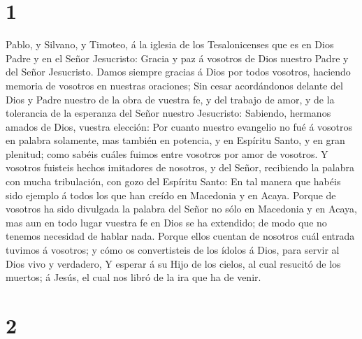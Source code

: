 \hypertarget{section}{%
\section{1}\label{section}}

 Pablo, y Silvano, y Timoteo, á la iglesia de los
Tesalonicenses que es en Dios Padre y en el Señor Jesucristo: Gracia y
paz á vosotros de Dios nuestro Padre y del Señor Jesucristo.
 Damos siempre gracias á Dios por todos vosotros, haciendo
memoria de vosotros en nuestras oraciones;  Sin cesar
acordándonos delante del Dios y Padre nuestro de la obra de vuestra fe,
y del trabajo de amor, y de la tolerancia de la esperanza del Señor
nuestro Jesucristo:  Sabiendo, hermanos amados de Dios,
vuestra elección:  Por cuanto nuestro evangelio no fué á
vosotros en palabra solamente, mas también en potencia, y en Espíritu
Santo, y en gran plenitud; como sabéis cuáles fuimos entre vosotros por
amor de vosotros.  Y vosotros fuisteis hechos imitadores de
nosotros, y del Señor, recibiendo la palabra con mucha tribulación, con
gozo del Espíritu Santo:  En tal manera que habéis sido
ejemplo á todos los que han creído en Macedonia y en Acaya. 
Porque de vosotros ha sido divulgada la palabra del Señor no sólo en
Macedonia y en Acaya, mas aun en todo lugar vuestra fe en Dios se ha
extendido; de modo que no tenemos necesidad de hablar nada. 
Porque ellos cuentan de nosotros cuál entrada tuvimos á vosotros; y cómo
os convertisteis de los ídolos á Dios, para servir al Dios vivo y
verdadero,  Y esperar á su Hijo de los cielos, al cual
resucitó de los muertos; á Jesús, el cual nos libró de la ira que ha de
venir.

\hypertarget{section-1}{%
\section{2}\label{section-1}}

